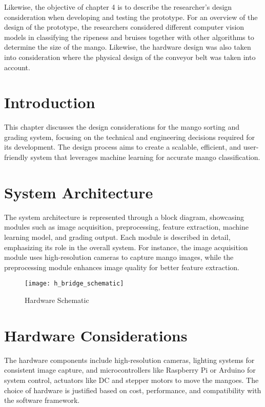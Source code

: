 
Likewise, the objective of chapter 4 is to describe the researcher's design 
consideration when developing and testing the prototype. For an overview of 
the design of the prototype, the researchers considered different computer vision models in
 classifying the ripeness and bruises together with other algorithms to determine 
 the size of the mango. Likewise, the hardware design was also taken into consideration where 
 the physical design of the conveyor belt was taken into account.

\section{Introduction}
This chapter discusses the design considerations for the mango 
sorting and grading system, focusing on the technical and engineering decisions 
required for its development. The design process aims to create a scalable, efficient, 
and user-friendly system that leverages machine learning for accurate mango classification.

\section{System Architecture}
The system architecture is represented through a block diagram, showcasing modules such as image acquisition, 
preprocessing, feature extraction, machine learning model, and grading output. Each module is described in detail, 
emphasizing its role in the overall system. For instance, the image acquisition module uses high-resolution cameras 
to capture mango images, while the preprocessing module enhances image quality for better feature extraction.

\begin{figure}[!htbp]
	\centering
	\texttt{[image: h\_bridge\_schematic]}
	\caption{Hardware Schematic}
	\label{fig:h_bridge_fig}
\end{figure}

\section{Hardware Considerations}
The hardware components include high-resolution cameras, lighting systems for consistent image capture, and 
microcontrollers like Raspberry Pi or Arduino for system control, actuators like DC and stepper motors to move 
the mangoes. The choice of hardware is justified based on cost, performance, and compatibility with the software framework.

